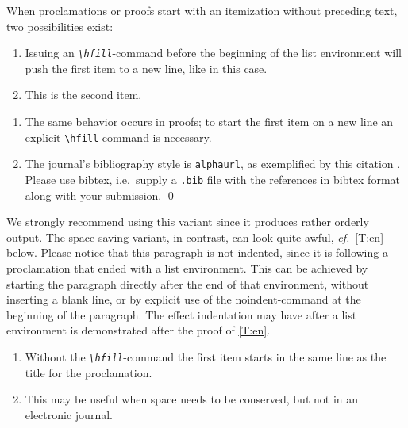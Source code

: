\documentclass{lmcs} %
\theoremstyle{plain}\newtheorem{satz}[thm]{Satz} %
\def\cf{{\em cf.}}
\begin{document}
  When proclamations or proofs start with an itemization without
  preceding text, two possibilities exist:

\begin{thm}\label{T:m}\hfill  %
\begin{enumerate}
\item
  Issuing an {\em\texttt{\textbackslash hfill}}-command before the
  beginning of the list environment will push the first item to a new
  line, like in this case.
\item
  This is the second item.
\end{enumerate}
\end{thm}

\proof\hfill  %
\begin{enumerate}
\item
  The same behavior occurs in proofs; to start the first item on a
  new line an explicit \texttt{\textbackslash hfill}-command is necessary.
\item
  The journal's bibliography style is \texttt{alphaurl}, as exemplified
  by this citation \cite{koslowski:mib}. Please use bibtex, i.e.\ supply a
  \verb|.bib| file with the references in bibtex format along with your submission. \qed
\end{enumerate}

  \noindent We strongly recommend using this variant since it produces
  rather orderly output.  The space-saving variant, in contrast, can
  look quite awful, \cf~\autoref{T:en} below.  Please notice that
  this paragraph is not indented, since it is following a proclamation
  that ended with a list environment.  This can be achieved by
  starting the paragraph directly after the end of that environment,
  without inserting a blank line, or by explicit use of the
  noindent-command at the beginning of the paragraph.  The effect
  indentation may have after a list environment is demonstrated after
  the proof of \autoref{T:en}.

\begin{thm}\label{T:en} %

\begin{enumerate}%
\item
  Without the \emph{\texttt{\textbackslash hfill}}-command the first item
  starts in the same line as the title for the proclamation.
\item
  This may be useful when space needs to be conserved, but not in an
  electronic journal.
\end{enumerate}
\end{thm}
\end{document}
